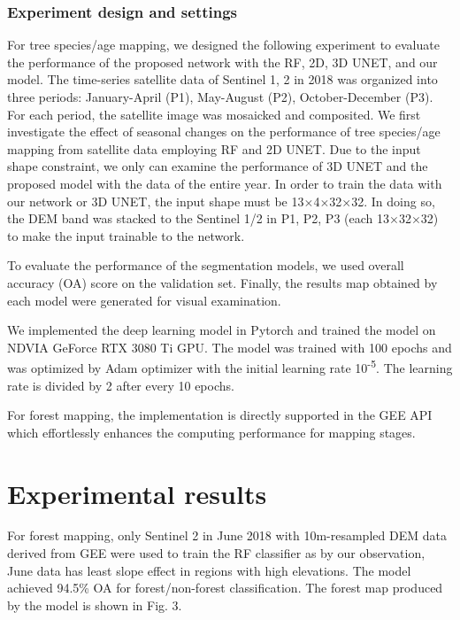 \subsubsection*{Experiment design and settings}
For tree species/age mapping, we designed the following experiment to evaluate the performance of the proposed network with the RF, 2D, 3D UNET, and our model. The time-series satellite data of Sentinel 1, 2 in 2018 was organized into three periods: January-April (P1), May-August (P2), October-December (P3). For each period, the satellite image was mosaicked and composited. We first investigate the effect of seasonal changes on the performance of tree species/age mapping from satellite data employing RF and 2D UNET. Due to the input shape constraint, we only can examine the performance of 3D UNET and the proposed model with the data of the entire year.  In order to train the data with our network or 3D UNET, the input shape must be 13$\times$4$\times$32$\times$32. In doing so, the DEM band was stacked to the Sentinel 1/2 in P1, P2, P3 (each 13$\times$32$\times$32) to make the input trainable to the network. \par
To evaluate the performance of the segmentation models, we used overall accuracy (OA) score on the validation set. Finally, the results map obtained by each model were generated for visual examination. \par
We implemented the deep learning model in Pytorch and trained the model on NDVIA GeForce RTX 3080 Ti GPU. The model was trained with 100 epochs and was optimized by Adam optimizer with the initial learning rate 10\textsuperscript{-5}. The learning rate is divided by 2 after every 10 epochs.\par
For forest mapping, the implementation is directly supported in the GEE API which effortlessly enhances the computing performance for mapping stages. \par

\section{Experimental results} \label{chap5_result}
For forest mapping, only Sentinel 2 in June 2018 with 10m-resampled DEM data derived from GEE were used to train the RF classifier as by our observation, June data has least slope effect in regions with high elevations. The model achieved 94.5\% OA for forest/non-forest classification. The forest map produced by the model is shown in Fig. 3. \par

